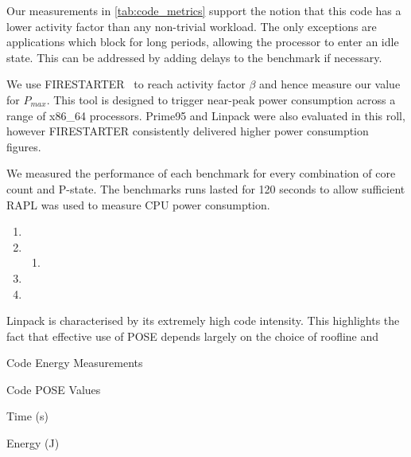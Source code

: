 Our measurements in \autoref{tab:code_metrics} support the notion that this code has a lower activity factor than any non-trivial workload.
The only exceptions are applications which block for long periods, allowing the processor to enter an idle state. 
This can be addressed by adding delays to the benchmark if necessary.

We use FIRESTARTER~\cite{hackenberg:2013ab} to reach activity factor $\beta$ and hence measure our value for $P_{max}$.
This tool is designed to trigger near-peak power consumption across a range of x86\_64 processors.
Prime95 and Linpack were also evaluated in this roll, however FIRESTARTER consistently delivered higher power consumption figures.

We measured the performance of each benchmark for every combination of core count and P-state.
The benchmarks runs lasted for 120 seconds to allow sufficient 
RAPL was used to measure CPU power consumption.


\clearpage

\begin{enumerate}
  \item {}
  \item {}
  \begin{enumerate}
    \item {}
  \end{enumerate}
  \item {}
  \item {}
\end{enumerate}



Linpack is characterised by its extremely high code intensity.
This highlights the fact that effective use of POSE depends largely on the choice of roofline and


\begin{table}
\centering
\caption{Code Energy Measurements}
\label{tab:code_metrics}

\end{table}

\begin{table}
  \setlength{\tabcolsep}{.5em}
  \caption{Code POSE Values}
  \begin{subtable}{\textwidth}
  \centering
  \caption{Time (s)}
  
  \end{subtable}
  \begin{subtable}{\textwidth}
  \centering
  \caption{Energy (J)}
  
  \end{subtable}
  \label{tab:pose_params}
\end{table}



